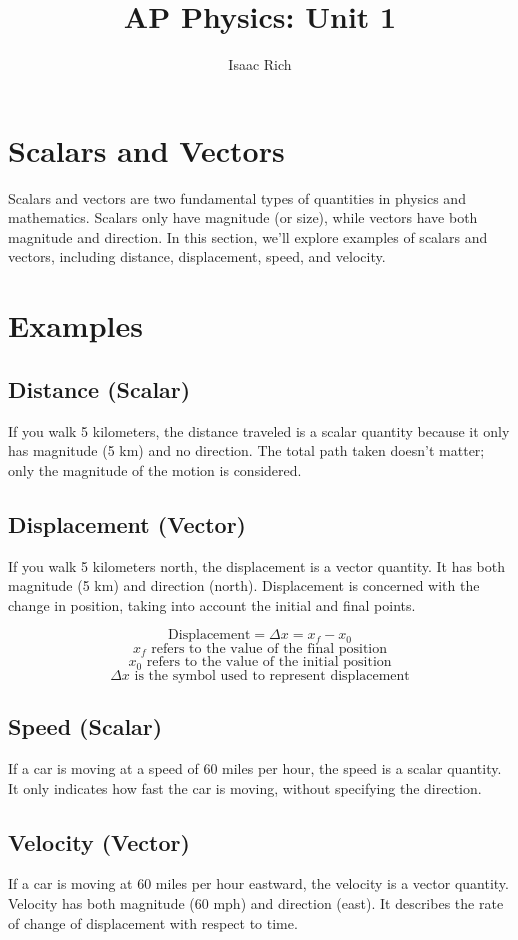 \documentclass{article}
\title{AP Physics: Unit 1}
\author{Isaac Rich}
\theoremstyle{mytheoremstyle}
\theoremstyle{mytheoremstyle}
\theoremstyle{myproblemstyle}
\begin{document}
\maketitle

\section{Scalars and Vectors}
Scalars and vectors are two fundamental types of quantities in physics and mathematics. Scalars only have magnitude (or size), while vectors have both magnitude and direction. In this section, we'll explore examples of scalars and vectors, including distance, displacement, speed, and velocity.

\section*{Examples}
\subsection{Distance (Scalar)}
If you walk 5 kilometers, the distance traveled is a scalar quantity because it only has magnitude (5 km) and no direction. The total path taken doesn't matter; only the magnitude of the motion is considered.

\subsection{Displacement (Vector)}
If you walk 5 kilometers north, the displacement is a vector quantity. It has both magnitude (5 km) and direction (north). Displacement is concerned with the change in position, taking into account the initial and final points.

\[
\text{Displacement} = \Delta x = x_f - x_0
\]
\[
x_f \text{ refers to the value of the final position}
\]
\[
x_0 \text{ refers to the value of the initial position}
\]
\[
\Delta x \text{ is the symbol used to represent displacement}
\]

\subsection{Speed (Scalar)}
If a car is moving at a speed of 60 miles per hour, the speed is a scalar quantity. It only indicates how fast the car is moving, without specifying the direction.

\subsection{Velocity (Vector)}
If a car is moving at 60 miles per hour eastward, the velocity is a vector quantity. Velocity has both magnitude (60 mph) and direction (east). It describes the rate of change of displacement with respect to time.
\newpage
\end{document}
